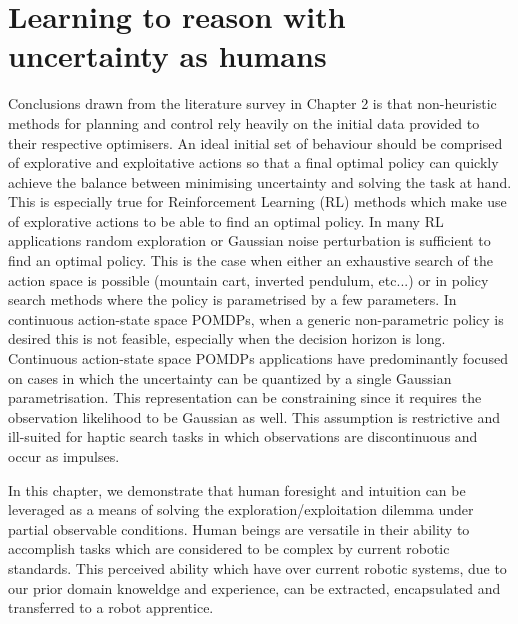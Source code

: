 \chapter{Learning to reason with uncertainty as humans}
%
%
%
Conclusions drawn from the literature survey in Chapter 2 is that non-heuristic methods for planning and control 
rely heavily on the initial data provided to their respective optimisers. An ideal initial set of behaviour should be comprised
of explorative and exploitative actions so that a final optimal policy can quickly achieve the balance between minimising 
uncertainty and solving the task at hand. This is especially true for Reinforcement Learning (RL) methods which make use of 
explorative actions to be able to find an optimal policy. In many RL applications random exploration or Gaussian noise perturbation
is sufficient to find an optimal policy. This is the case when either an exhaustive search of the action space is possible 
(mountain cart, inverted pendulum, etc...) or in policy search methods where the policy is parametrised by a few parameters.
In continuous action-state space POMDPs, when a generic non-parametric policy is desired  this is not feasible, especially 
when the decision horizon is long. Continuous action-state space POMDPs applications have predominantly focused on cases in which 
the uncertainty can be quantized by a single Gaussian parametrisation. This representation can be constraining since it requires 
the observation likelihood to be Gaussian as well. This assumption is restrictive and ill-suited for haptic search tasks in 
which observations are discontinuous and occur as impulses. 

In this chapter, we demonstrate that human foresight and intuition can be leveraged as a means of solving the 
exploration/exploitation dilemma under partial observable conditions. Human beings are versatile in their ability to 
accomplish tasks which are considered to be complex by current robotic standards. This perceived ability which have over 
current robotic systems, due to our prior domain knoweldge and experience, can be extracted, encapsulated and transferred 
to a robot apprentice.

